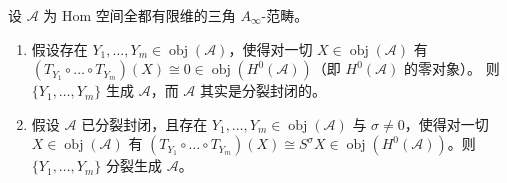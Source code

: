 \begin{Cor}\label{cor:4.24}
设 $\mathcal A$ 为 Hom 空间全都有限维的三角 $A_\infty$-范畴。
\begin{enumerate}[label=\textup{\roman*}.,leftmargin=*]
  \item 假设存在 $Y_1,\dots,Y_m\in\operatorname{obj}(\mathcal A)$，使得对一切
        $X\in\operatorname{obj}(\mathcal A)$ 有
        $(T_{Y_1}\circ\dots\circ T_{Y_m})(X)\cong 0
        \in\operatorname{obj}(H^0(\mathcal A))$（即 $H^0(\mathcal A)$ 的零对象）。
        则 $\{Y_1,\dots,Y_m\}$ 生成 $\mathcal A$，而 $\mathcal A$ 其实是分裂封闭的。
  \item 假设 $\mathcal A$ 已分裂封闭，且存在
        $Y_1,\dots,Y_m\in\operatorname{obj}(\mathcal A)$ 与 $\sigma\neq0$，使得对一切
        $X\in\operatorname{obj}(\mathcal A)$ 有
        $(T_{Y_1}\circ\dots\circ T_{Y_m})(X)\cong S^\sigma X
        \in\operatorname{obj}(H^0(\mathcal A))$。则 $\{Y_1,\dots,Y_m\}$ 分裂生成
        $\mathcal A$。
\end{enumerate}
\end{Cor}

